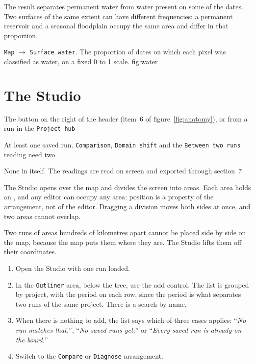 \documentclass[12pt,a4paper]{article}
\newcommand{\msg}[1]{``\textit{#1}''}
\begin{document}
The result separates permanent water from water present on some of the dates.
Two surfaces of the same extent can have different frequencies: a permanent
reservoir and a seasonal floodplain occupy the same area and differ in that
proportion.

  {\texttt{Map} $\rightarrow$ \texttt{Surface water}. The proportion of dates
   on which each pixel was classified as water, on a fixed 0 to 1 scale.}
  {fig:water}

\section{The Studio}

\begin{ficha}
  \item[How to open] The button on the right of the header (item~6 of
        figure~\ref{fig:anatomy}), or from a run in the \texttt{Project hub}
  \item[Preconditions] At least one saved run. \texttt{Comparison},
        \texttt{Domain shift} and the \texttt{Between two runs} reading need
        two
  \item[Output] None in itself. The readings are read on screen and exported
        through section~7
\end{ficha}

The Studio opens over the map and divides the screen into areas. Each area
holds an , and any editor can occupy any area: position is a
property of the arrangement, not of the editor. Dragging a division moves both
sides at once, and two areas cannot overlap.

 Two runs of areas hundreds of kilometres apart cannot be
placed side by side on the map, because the map puts them where they are. The
Studio lifts them off their coordinates.


\begin{enumerate}[leftmargin=*,itemsep=.3em]
  \item Open the Studio with one run loaded.
  \item In the \texttt{Outliner} area, below the tree, use the add control. The
        list is grouped by project, with the period on each row, since the
        period is what separates two runs of the same project. There is a
        search by name.
  \item When there is nothing to add, the list says which of three cases
        applies: \msg{No run matches that.}, \msg{No saved runs yet.} or
        \msg{Every saved run is already on the board.}
  \item Switch to the \texttt{Compare} or \texttt{Diagnose} arrangement.
\end{enumerate}
\end{document}
